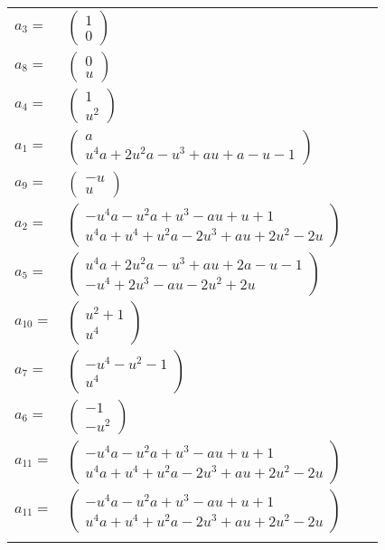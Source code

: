 \documentclass[1p]{elsarticle_modified}
\theoremstyle{definition}
\begin{document}
\begin{tabular}{m{7pt} m{180pt} m{7pt} m{180pt} }
\flushright $a_{3}=$&$\begin{pmatrix}1\\0\end{pmatrix}$ \\
\flushright $a_{8}=$&$\begin{pmatrix}0\\u\end{pmatrix}$ \\
\flushright $a_{4}=$&$\begin{pmatrix}1\\u^2\end{pmatrix}$ \\
\flushright $a_{1}=$&$\begin{pmatrix}a\\u^4 a+2 u^2 a- u^3+a u+a- u-1\end{pmatrix}$ \\
\flushright $a_{9}=$&$\begin{pmatrix}- u\\u\end{pmatrix}$ \\
\flushright $a_{2}=$&$\begin{pmatrix}- u^4 a- u^2 a+u^3- a u+u+1\\u^4 a+u^4+u^2 a-2 u^3+a u+2 u^2-2 u\end{pmatrix}$ \\
\flushright $a_{5}=$&$\begin{pmatrix}u^4 a+2 u^2 a- u^3+a u+2 a- u-1\\- u^4+2 u^3- a u-2 u^2+2 u\end{pmatrix}$ \\
\flushright $a_{10}=$&$\begin{pmatrix}u^2+1\\u^4\end{pmatrix}$ \\
\flushright $a_{7}=$&$\begin{pmatrix}- u^4- u^2-1\\u^4\end{pmatrix}$ \\
\flushright $a_{6}=$&$\begin{pmatrix}-1\\- u^2\end{pmatrix}$ \\
\flushright $a_{11}=$&$\begin{pmatrix}- u^4 a- u^2 a+u^3- a u+u+1\\u^4 a+u^4+u^2 a-2 u^3+a u+2 u^2-2 u\end{pmatrix}$\\ \flushright $a_{11}=$&$\begin{pmatrix}- u^4 a- u^2 a+u^3- a u+u+1\\u^4 a+u^4+u^2 a-2 u^3+a u+2 u^2-2 u\end{pmatrix}$\\&\end{tabular}
\end{document}
